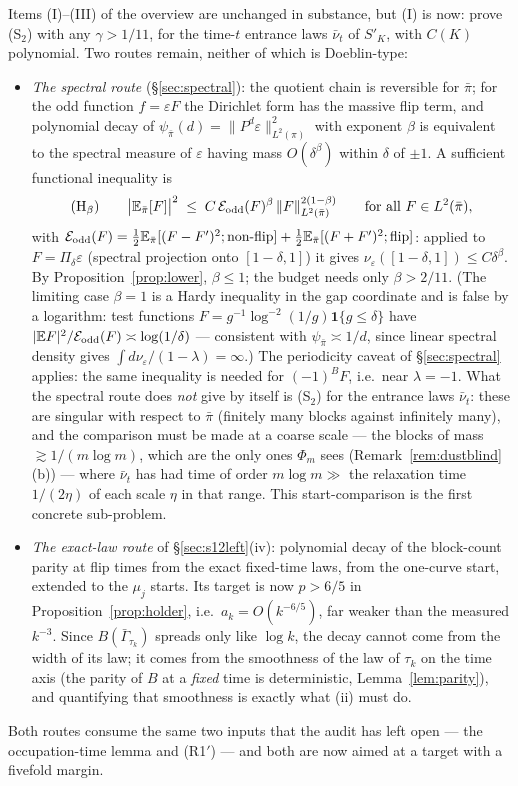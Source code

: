 Items (I)--(III) of the overview are unchanged in substance, but (I)
is now: prove (S$_2$) with any $\gamma>1/11$, for the time-$t$
entrance laws $\bar\nu_t$ of $S'_K$, with $C(K)$ polynomial.  Two routes remain, neither of
which is Doeblin-type:
\begin{itemize}[leftmargin=2em]
\item[(i)] \emph{The spectral route} (\S\ref{sec:spectral}): the
quotient chain is reversible for $\bar\pi$; for the odd function
$f=\varepsilon F$ the Dirichlet form has the massive flip term, and
polynomial decay of $\psi_{\bar\pi}(d)=\|P^d\varepsilon\|^2_{L^2(\pi)}$
with exponent $\beta$ is equivalent to the spectral measure of
$\varepsilon$ having mass $O(\delta^\beta)$ within $\delta$ of
$\pm1$.  A sufficient functional inequality is
\[
\text{(H$_\beta$)}\qquad
\bigl|\mathbb{E}_{\bar\pi}[F]\bigr|^2\;\le\;C\,\mathcal E_{\mathrm{odd}}(F)^{\beta}\,\|F\|_{L^2(\bar\pi)}^{2(1-\beta)}
\qquad\text{for all }F\in L^2(\bar\pi),
\]
with $\mathcal E_{\mathrm{odd}}(F)=\tfrac12\mathbb{E}_{\bar\pi}[(F-F')^2;\text{non-flip}]
+\tfrac12\mathbb{E}_{\bar\pi}[(F+F')^2;\text{flip}]$: applied to
$F=\Pi_\delta\varepsilon$ (spectral projection onto
$[1-\delta,1]$) it gives $\nu_\varepsilon([1-\delta,1])\le C\delta^\beta$.
By Proposition~\ref{prop:lower}, $\beta\le1$; the budget needs only
$\beta>2/11$.  (The limiting case $\beta=1$ is a Hardy inequality
in the gap coordinate and is false by a logarithm: test functions
$F=g^{-1}\log^{-2}(1/g)\mathbf 1\{g\le\delta\}$ have
$|\mathbb{E} F|^2/\mathcal E_{\mathrm{odd}}(F)\asymp\log(1/\delta)$ --- consistent
with $\psi_{\bar\pi}\asymp1/d$, since linear spectral density gives
$\int d\nu_\varepsilon/(1-\lambda)=\infty$.)  The periodicity
caveat of \S\ref{sec:spectral} applies: the same inequality is
needed for $(-1)^BF$, i.e.\ near $\lambda=-1$.  What the spectral
route does \emph{not} give by itself is (S$_2$) for the entrance
laws $\bar\nu_t$: these are singular with respect to $\bar\pi$
(finitely many blocks against infinitely many), and the comparison
must be made at a coarse scale --- the blocks of mass $\gtrsim1/(m\log m)$,
which are the only ones $\Phi_m$ sees (Remark~\ref{rem:dustblind}(b))
--- where $\bar\nu_t$ has had time of order $m\log m\gg$ the
relaxation time $1/(2\eta)$ of each scale $\eta$ in that range.
This start-comparison is the first concrete sub-problem.
\item[(ii)] \emph{The exact-law route} of \S\ref{sec:s12left}(iv):
polynomial decay of the block-count parity at flip times from the
exact fixed-time laws, from the one-curve start, extended to the
$\mu_j$ starts.  Its target is now $p>6/5$ in
Proposition~\ref{prop:holder}, i.e.\ $a_k=O(k^{-6/5})$, far weaker
than the measured $k^{-3}$.  Since $B(\bar\Gamma_{\tau_k})$ spreads
only like $\log k$, the decay cannot come from the width of its law;
it comes from the smoothness of the law of $\tau_k$ on the time axis
(the parity of $B$ at a \emph{fixed} time is deterministic,
Lemma~\ref{lem:parity}), and quantifying that smoothness is exactly
what (ii) must do.
\end{itemize}
Both routes consume the same two inputs that the audit has left open
--- the occupation-time lemma and (R1$'$) --- and both are now aimed at
a target with a fivefold margin.

